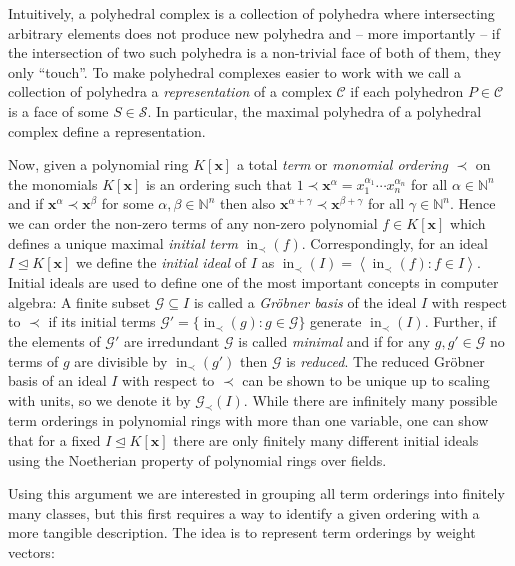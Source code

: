 \documentclass[
  paper=a4,
  titlepage,
  bibliography=totoc,
  listof=totoc,
  pagesize=pdftex
]{scrartcl}
\numberwithin{figure}{section}
\numberwithin{equation}{section}
\numberwithin{table}{section}
\newcommand*\setN{\mathds{N}}
\newcommand*\ideal[1]{\left\langle #1 \right\rangle}
\let\vec\mathbf
\let\idealof\trianglelefteq
\DeclareMathOperator{\initial}{in}
\theoremstyle{definition}
\numberwithin{definition}{section}
\begin{document}
Intuitively, a polyhedral complex is a collection of polyhedra where intersecting
arbitrary elements does not produce new polyhedra and -- more importantly -- if the
intersection of two such polyhedra is a non-trivial face of both of them, they only
\enquote{touch}. To make polyhedral complexes easier to work with we call a collection of
polyhedra a \emph{representation} of a complex $\mathcal C$ if each polyhedron $P \in
\mathcal C$ is a face of some $S \in \mathcal S$. In particular, the maximal polyhedra of
a polyhedral complex define a representation.

Now, given a polynomial ring $K[\vec x]$ a total \emph{term} or \emph{monomial ordering}
$\prec$ on the monomials $K[\vec x]$ is an ordering such that $1 \prec \vec x^\alpha =
x_1^{\alpha_1}\cdots x_n^{\alpha_n}$ for all $\alpha \in \setN^n$ and if $\vec x^\alpha
\prec \vec x^\beta$ for some $\alpha, \beta \in \setN^n$ then also $\vec x^{\alpha+\gamma}
\prec \vec x^{\beta+\gamma}$ for all $\gamma \in \setN^n$. Hence we can order the non-zero
terms of any non-zero polynomial $f \in K[\vec x]$ which defines a unique maximal
\emph{initial term} $\initial_\prec(f)$. Correspondingly, for an ideal $I \idealof K[\vec
x]$ we define the \emph{initial ideal} of $I$ as $\initial_\prec(I) =
\ideal{\initial_\prec(f) : f \in I}$. Initial ideals are used to define one of the most
important concepts in computer algebra: A finite subset $\mathcal G \subseteq I$ is called
a \emph{Gröbner basis} of the ideal $I$ with respect to $\prec$ if its initial terms
$\mathcal G' = \{ \initial_\prec(g) : g \in \mathcal G \}$ generate $\initial_\prec(I)$.
Further, if the elements of $\mathcal G'$ are irredundant $\mathcal G$ is called
\emph{minimal} and if for any $g, g' \in \mathcal G$ no terms of $g$ are divisible by
$\initial_\prec(g')$ then $\mathcal G$ is \emph{reduced}. The reduced Gröbner basis of an
ideal $I$ with respect to $\prec$ can be shown to be unique up to scaling with units, so
we denote it by $\mathcal G_\prec(I)$. While there are infinitely many possible term
orderings in polynomial rings with more than one variable, one can show that for a fixed
$I \idealof K[\vec x]$ there are only finitely many different initial ideals using the
Noetherian property of polynomial rings over fields.

Using this argument we are interested in grouping all term orderings into finitely many
classes, but this first requires a way to identify a given ordering with a more tangible
description. The idea is to represent term orderings by weight vectors:
\end{document}
